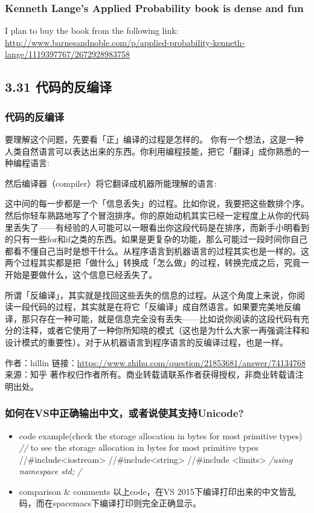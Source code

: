 \documentclass[11pt]{article}
\begin{document}
\subsubsection*{Kenneth Lange's \textbf{Applied Probability} book is dense and fun}
\label{sec:orgheadline176}
I plan to buy the book from the following link:
\url{http://www.barnesandnoble.com/p/applied-probability-kenneth-lange/1119397767/2672928983758}
\subsection*{3.31 代码的反编译}
\label{sec:orgheadline182}
\subsubsection*{代码的反编译}
\label{sec:orgheadline178}
要理解这个问题，先要看「正」编译的过程是怎样的。
你有一个想法，这是一种人类自然语言可以表达出来的东西。你利用编程技能，把它「翻译」成你熟悉的一种编程语言:

然后编译器（compiler）将它翻译成机器所能理解的语言:

这中间的每一步都是一个「信息丢失」的过程。比如你说，我要把这些数排个序。然后你轻车熟路地写了个冒泡排序。你的原始动机其实已经一定程度上从你的代码里丢失了——有经验的人可能可以一眼看出你这段代码是在排序，而新手小明看到的只有一些for和if之类的东西。如果是更复杂的功能，那么可能过一段时间你自己都看不懂自己当时是想干什么。从程序语言到机器语言的过程其实也是一样的。这两个过程其实都是把「做什么」转换成「怎么做」的过程，转换完成之后，究竟一开始是要做什么，这个信息已经丢失了。

所谓「反编译」，其实就是找回这些丢失的信息的过程。从这个角度上来说，你阅读一段代码的过程，其实就是在将它「反编译」成自然语言。如果要完美地反编译，那只存在一种可能，就是信息完全没有丢失——比如说你阅读的这段代码有充分的注释，或者它使用了一种你所知晓的模式（这也是为什么大家一再强调注释和设计模式的重要性）。对于从机器语言到程序语言的反编译过程，也是一样。


作者：hillin
链接：\url{https://www.zhihu.com/question/21853681/answer/74134768}
来源：知乎
著作权归作者所有。商业转载请联系作者获得授权，非商业转载请注明出处。
\subsubsection*{如何在VS中正确输出中文，或者说使其支持Unicode?}
\label{sec:orgheadline181}
\begin{itemize}
\item code example(check the storage allocation in bytes for most primitive types)
\label{sec:orgheadline179}
\emph{//} to see the storage allocation in bytes for most primitive types
//\#include<iostream>  
//\#include<string>  
//\#include <limits>  
\emph{/using namespace std;
/}
\item comparison \& comments
\label{sec:orgheadline180}
以上code，在VS 2015下编译打印出来的中文皆乱码，而在spacemacs下编译打印则完全正确显示。
\end{itemize}
\end{document}
